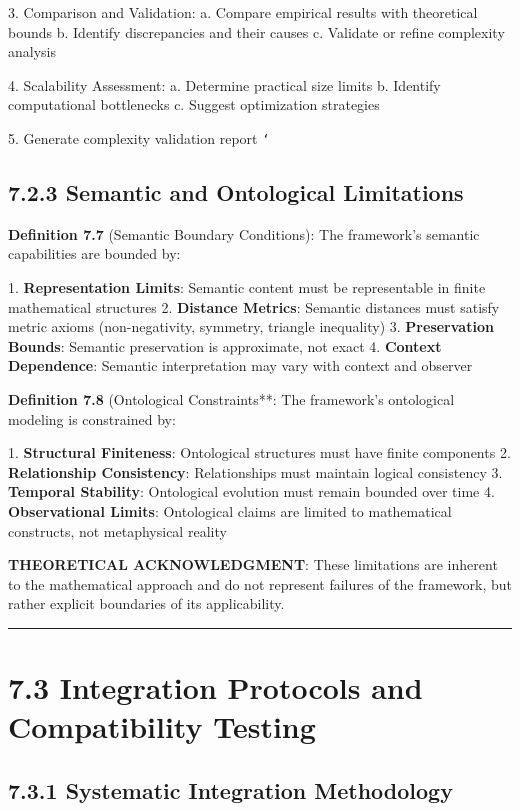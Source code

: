 3. Comparison and Validation:
   a. Compare empirical results with theoretical bounds
   b. Identify discrepancies and their causes
   c. Validate or refine complexity analysis
   
4. Scalability Assessment:
   a. Determine practical size limits
   b. Identify computational bottlenecks
   c. Suggest optimization strategies
   
5. Generate complexity validation report
\texttt{`}

\subsection{7.2.3 Semantic and Ontological Limitations}

\textbf{Definition 7.7} (Semantic Boundary Conditions): The framework's semantic capabilities are bounded by:

1. \textbf{Representation Limits}: Semantic content must be representable in finite mathematical structures
2. \textbf{Distance Metrics}: Semantic distances must satisfy metric axioms (non-negativity, symmetry, triangle inequality)
3. \textbf{Preservation Bounds}: Semantic preservation is approximate, not exact
4. \textbf{Context Dependence}: Semantic interpretation may vary with context and observer

\textbf{Definition 7.8} (Ontological Constraints**: The framework's ontological modeling is constrained by:

1. \textbf{Structural Finiteness}: Ontological structures must have finite components
2. \textbf{Relationship Consistency}: Relationships must maintain logical consistency
3. \textbf{Temporal Stability}: Ontological evolution must remain bounded over time
4. \textbf{Observational Limits}: Ontological claims are limited to mathematical constructs, not metaphysical reality

\textbf{THEORETICAL ACKNOWLEDGMENT}: These limitations are inherent to the mathematical approach and do not represent failures of the framework, but rather explicit boundaries of its applicability.

\hrule

\section{7.3 Integration Protocols and Compatibility Testing}

\subsection{7.3.1 Systematic Integration Methodology}

